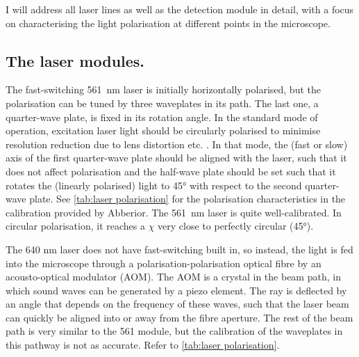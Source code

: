 I will address all laser lines as well as the detection module in detail, with a focus on characterising the light polarisation at different points in the microscope.

\subsection{The laser modules.} The fast-switching 561~nm laser is initially horizontally polarised, but the polarisation can be tuned by three waveplates in its path. The last one, a quarter-wave plate, is fixed in its rotation angle. In the standard mode of operation, excitation laser light should be circularly polarised to minimise resolution reduction due to lens distortion etc. \cite{Harke2008}. In that mode, the (fast or slow) axis of the first quarter-wave plate should be aligned with the laser, such that it does not affect polarisation and the half-wave plate should be set such that it rotates the (linearly polarised) light to \ang{45} with respect to the second quarter-wave plate. See \autoref{tab:laser polarisation} for the polarisation characteristics in the calibration provided by Abberior. The 561~nm laser is quite well-calibrated. In circular polarisation, it reaches a $ \chi $ very close to perfectly circular (\ang{45}).

The 640 nm laser does not have fast-switching built in, so instead, the light is fed into the microscope through a polarisation-polarisation optical fibre by an acousto-optical modulator (AOM). The AOM is a crystal in the beam path, in which sound waves can be generated by a piezo element. The ray is deflected by an angle that depends on the frequency of these waves, such that the laser beam can quickly be aligned into or away from the fibre aperture. The rest of the beam path is very similar to the 561 module, but the calibration of the waveplates in this pathway is not as accurate. Refer to \autoref{tab:laser polarisation}. 

